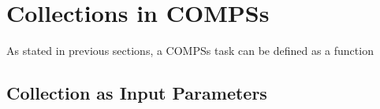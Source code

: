 \section{Collections in COMPSs}
\label{sec:col}
As stated in previous sections, a COMPSs task can be defined as a function 

\subsection{Collection as Input Parameters}
\label{subsec:col_in}

